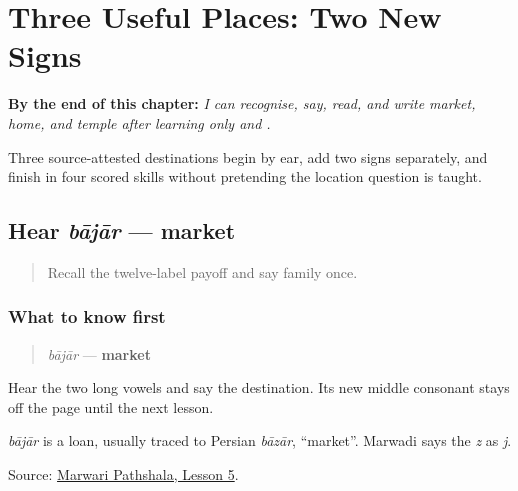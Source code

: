 
\chapter{Three Useful Places: Two New Signs}
\label{ch:mw-places-three}

\begin{chapteropening}
\textbf{By the end of this chapter:} \emph{I can recognise, say, read, and write market, home, and temple after learning only  and .}

Three source-attested destinations begin by ear, add two signs separately, and finish in four scored skills without pretending the location question is taught.
\end{chapteropening}

\section[bājār]{Hear \emph{bājār} — market}

\label{lesson:MW-C10-hear-bajar}



\begin{quote}
Recall the twelve-label payoff and say family once.
\end{quote}

\subsection*{What to know first}
\begin{quote}
\emph{bājār} — \textbf{market}
\end{quote}

Hear the two long vowels and say the destination. Its new middle consonant stays off the page until the next lesson.

\begin{cousinweb}
\emph{bājār} is a loan, usually traced to Persian \emph{bāzār}, \textquotedblleft{}market\textquotedblright{}. Marwadi says the \emph{z} as \emph{j}.
\end{cousinweb}

\begin{tcolorbox}[breakable,colback=teal!4,colframe=teal!35!black,title={Before you move on}]
Source: \href{https://www.marwaripathshala.com/marwari-lesson-5-english}{Marwari Pathshala, Lesson 5}.
\end{tcolorbox}
